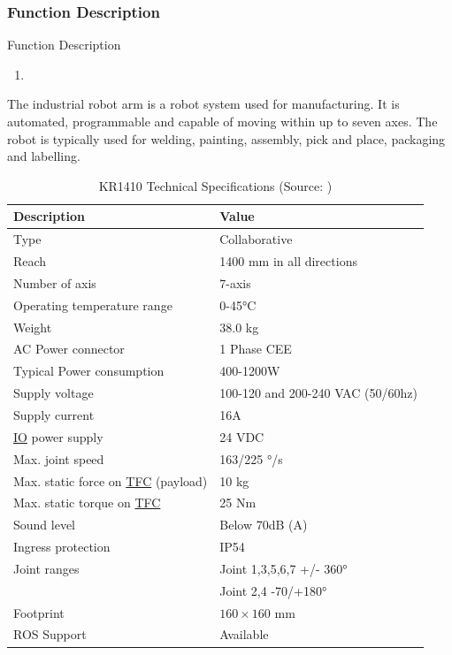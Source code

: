 \subsubsection{Function Description}
Function Description
\begin{enumerate}
    \item 
\end{enumerate}
The industrial robot arm is a robot system used for manufacturing. It is automated, programmable and
capable of moving within up to seven axes.
The robot is typically used for welding, painting, assembly, pick and place, packaging and labelling.
\begin{table}[h!]
    \centering
    \small
    \renewcommand{\arraystretch}{1.2} %
    \begin{tabular}{ll}
        \textbf{Description} & \textbf{Value} \\ \hline
        Type & Collaborative \\
        Reach & 1400 mm in all directions\\
        Number of axis & 7-axis \\
        Operating temperature range & 0-45°C\\ 
        Weight & 38.0 kg \\ 
        AC Power connector & 1 Phase CEE \\ 
        Typical Power consumption & 400-1200W \\ 
        Supply voltage & 100-120 and 200-240 VAC (50/60hz) \\ 
        Supply current & 16A\\ 
        \hyperref[acro:IO]{IO} power supply & 24 VDC\\ 
        Max. joint speed  & 163/225 °/s\\ 
        Max. static force on \hyperref[acro:TFC]{TFC} (payload) & 10 kg\\ 
        Max. static torque on \hyperref[acro:TFC]{TFC} & 25 Nm\\ 
        Sound level & Below 70dB (A) \\ 
        Ingress protection & IP54 \\ 
        Joint ranges & Joint 1,3,5,6,7 +/- 360° \\
        & Joint 2,4 -70/+180° \\ 
        Footprint& $160 \times 160$ mm \\ 
        ROS Support & Available \\ \hline
    \end{tabular}
    \caption{KR1410 Technical Specifications (Source: \cite[page 31]{kassow-specification})}
    \end{table}

